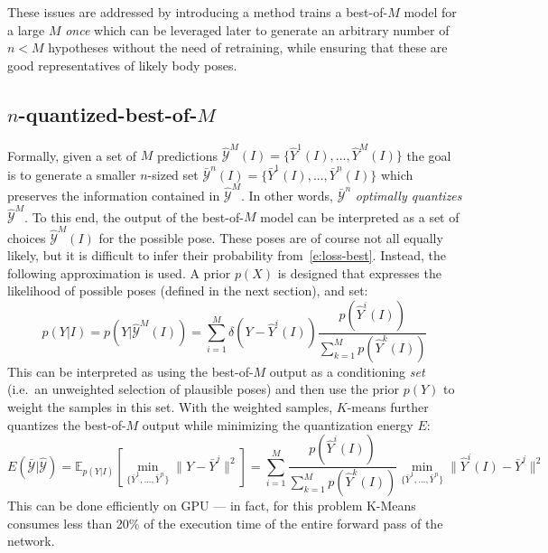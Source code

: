 These issues are addressed by introducing a method trains a best-of-$M$ model for a large $M$ \emph{once} which can be leveraged later to generate an arbitrary number of $n < M$ hypotheses without the need of retraining, while ensuring that these are good representatives of likely body poses.

\subsection{$n$-quantized-best-of-$M$}
Formally, given a set of $M$ predictions
$\mathcal{\hat Y}^M(I) = \{\hat Y^1(I), ..., \hat Y^M(I)\}$ the goal is to generate a smaller $n$-sized set
$\mathcal{\bar Y}^n(I) = \{\bar Y^1(I), ..., \bar Y^n(I)\}$ which preserves the information contained in $\mathcal{\hat Y}^M$.
In other words, $\mathcal{\bar Y}^n$ \emph{optimally quantizes} $\mathcal{\hat Y}^M$.
%
To this end, the output of the best-of-$M$ model can be interpreted as a set of choices $\mathcal{\hat Y}^M(I)$ for the possible pose.
These poses are of course not all equally likely, but it is difficult to infer their probability from~\eqref{e:loss-best}.
Instead, the following approximation is used.
A prior $p(X)$ is designed that expresses the likelihood of possible poses (defined in the next section), and set:
\begin{equation}\label{e:conditional}
p(Y|I)
=
p(Y|\mathcal{\hat Y}^M(I))
=
\sum_{i=1}^{M}
\delta({Y} - \hat{Y}^i(I))
\frac{p(\hat{Y}^i(I))}{
\sum_{k=1}^{M} p(\hat{Y}^k(I))}
\end{equation}
This can be interpreted as using the best-of-$M$ output as a conditioning \emph{set} (i.e.~an unweighted selection of plausible poses) and then use the prior $p(Y)$ to weight the samples in this set.
With the weighted samples, $K$-means \cite{lloyd1982least} further quantizes the best-of-$M$ output while minimizing the quantization energy $E$:
\begin{equation}\label{e:loss-quant}
E(\mathcal{\bar Y} | \mathcal{\hat Y}) = \mathbb{E}_{p(Y|I)}
\left[
    \min_{\{\bar Y^1, ..., \bar Y^n\}} \| Y - \bar Y^j \|^2
\right]
=
\sum_{i=1}^{M}
\frac{p(\hat{Y}^i(I))}{
\sum_{k=1}^{M} p(\hat{Y}^k(I))}
\min_{\{\bar Y^1,\dots,\bar Y^n\}}
\| \hat Y^i(I) - \bar Y^j \|^2
\end{equation}
This can be done efficiently on GPU --- in fact, for this problem K-Means consumes less than 20\% of the execution time of the entire forward pass of the network. 

